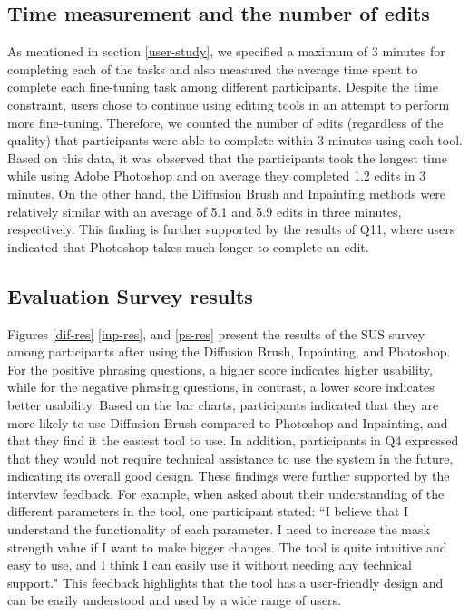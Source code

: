\documentclass[10pt,twocolumn,letterpaper]{article}
\begin{document}
\subsection{Time measurement and the number of edits} As mentioned in section \ref{user-study}, we specified a maximum of 3 minutes for completing each of the tasks and also measured the average time spent to complete each fine-tuning task among different participants.  Despite the time constraint, users chose to continue using editing tools in an attempt to perform more fine-tuning. Therefore, we counted the number of edits (regardless of the quality) that participants were able to complete within 3 minutes using each tool. Based on this data, it was observed that the participants took the longest time while using Adobe Photoshop and on average they completed 1.2 edits in 3 minutes. On the other hand, the Diffusion Brush and Inpainting methods were relatively similar with an average of 5.1 and 5.9 edits in three minutes, respectively. This finding is further supported by the results of Q11, where users indicated that Photoshop takes much longer to complete an edit.

\subsection{Evaluation Survey results}
Figures \ref{dif-res} \ref{inp-res}, and \ref{ps-res} present the results of the SUS survey among participants after using the Diffusion Brush, Inpainting, and Photoshop. For the positive phrasing questions, a higher score indicates higher usability, while for the negative phrasing questions, in contrast, a lower score indicates better usability.
Based on the bar charts, participants indicated that they are more likely to use Diffusion Brush compared to Photoshop and Inpainting, and that they find it the easiest tool to use. In addition, participants in Q4 expressed that they would not require technical assistance to use the system in the future, indicating its overall good design. These findings were further supported by the interview feedback. For example, when asked about their understanding of the different parameters in the tool, one participant stated: ``I believe that I understand the functionality of each parameter. I need to increase the mask strength value if I want to make bigger changes. The tool is quite intuitive and easy to use, and I think I can easily use it without needing any technical support." This feedback highlights that the tool has a user-friendly design and can be easily understood and used by a wide range of users. 
\end{document}
